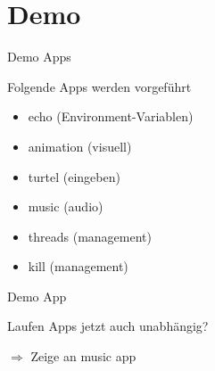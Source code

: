 \section{Demo}

\begin{frame}{Demo Apps}
    \begin{Large}
        Folgende Apps werden vorgeführt
    \end{Large}
    \vspace{15pt}

    \begin{itemize}
        \item echo (Environment-Variablen)
        \item animation (visuell)
        \item turtel (eingeben)
        \item music (audio)
        \item threads (management)
        \item kill (management)
    \end{itemize}
    
\end{frame}


\begin{frame}{Demo App}
    \begin{Large}
        Laufen Apps jetzt auch unabhängig?
    \end{Large}
    \vspace{15pt} 
    
    $\Rightarrow$ Zeige an music app
\end{frame}


